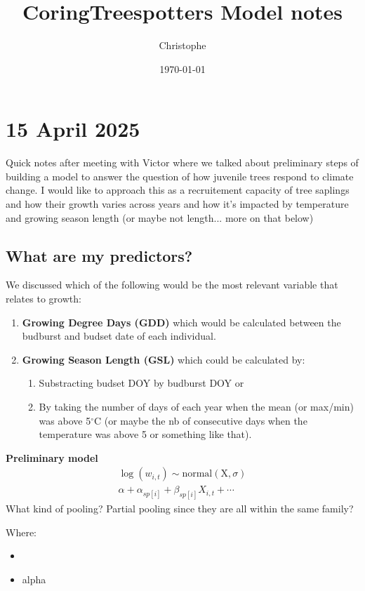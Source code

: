 \documentclass[a4paper,12pt]{article}
\title{CoringTreespotters Model notes}
\author{Christophe}
\date{\today}
\begin{document}
\maketitle

\section*{15 April 2025}
Quick notes after meeting with Victor where we talked about preliminary steps of building a model to answer the question of how juvenile trees respond to climate change. I would like to approach this as a recruitement capacity of tree saplings and how their growth varies across years and how it's impacted by temperature and growing season length (or maybe not length... more on that below)

\subsection*{What are my predictors?}
We discussed which of the following would be the most relevant variable that relates to growth:
\begin{enumerate}
	\item \textbf{Growing Degree Days (GDD)} which would be calculated between the budburst and budset date of each individual. 
	\item \textbf{Growing Season Length (GSL)} which could be calculated by:
	\begin{enumerate}
		\item Substracting budset DOY by budburst DOY or 
		\item By taking the number of days of each year when the mean (or max/min) was above 5$^{\circ}$C (or maybe the nb of consecutive days when the temperature was above 5 or something like that).
	\end{enumerate}
\end{enumerate}

\par
\textbf{Preliminary model} \\ 
\begin{align}
	\log (w_{i,t}) \sim \text{normal}(\text{X}, \sigma) \\
	\alpha + \alpha_{sp[i]} + \beta_{sp[i]} X_{i,t} + \cdots
\end{align} 
What kind of pooling? Partial pooling since they are all within the same family?


Where: 
\begin{itemize}
	\item 
	\item alpha
\end{itemize} 
\end{document}

